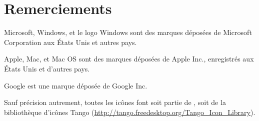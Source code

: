 
\chapter*{Remerciements}

Microsoft, Windows, et le logo Windows sont des marques déposées de Microsoft Corporation aux États Unis et autres pays.

Apple, Mac, et Mac OS sont des marques déposées de Apple Inc., enregistrés aux États Unis et d'autres pays.

Google est une marque déposée de Google Inc.

Sauf précision autrement, toutes les icônes font soit partie de \Tw, soit de la bibliothèque d'icônes Tango (\url{http://tango.freedesktop.org/Tango_Icon_Library}).

